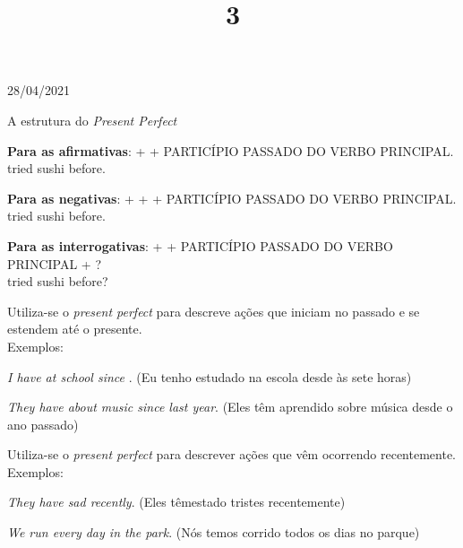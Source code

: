 \documentclass{SchoolBook}
\begin{document}
    \begin{day}{28/04/2021}
        \title{3}{A estrutura do \emph{Present Perfect}}
        
        \vspace{3pt}
        
        \textbf{Para as afirmativas}:  +  + PARTICÍPIO PASSADO DO VERBO PRINCIPAL. \\
          tried sushi before.
        
        \vspace{3pt}
        
        \textbf{Para as negativas}:  +  +  + PARTICÍPIO PASSADO DO VERBO PRINCIPAL. \\
          tried sushi before.
        
        \vspace{3pt}
        
        \textbf{Para as interrogativas}:  +  + PARTICÍPIO PASSADO DO VERBO PRINCIPAL + ? \\
          tried sushi before?
        
        \vspace{12pt}
        \noindent Utiliza-se o \emph{present perfect} para descreve ações que iniciam no passado e se estendem até o presente. \\
        Exemplos:
        
        \emph{I have  at school since }. (Eu tenho estudado na escola desde às sete horas)
        
        \emph{They have  about music since last year}. (Eles têm aprendido sobre música desde o ano passado)
        
        \vspace{12pt}
        \noindent Utiliza-se o \emph{present perfect} para descrever ações que vêm ocorrendo recentemente. \\
        Exemplos:
        
        \emph{They have  sad recently}. (Eles têmestado tristes recentemente)
        
        \emph{We  run every day in the park}. (Nós temos corrido todos os dias no parque)
        

\end{day}
\end{document}
